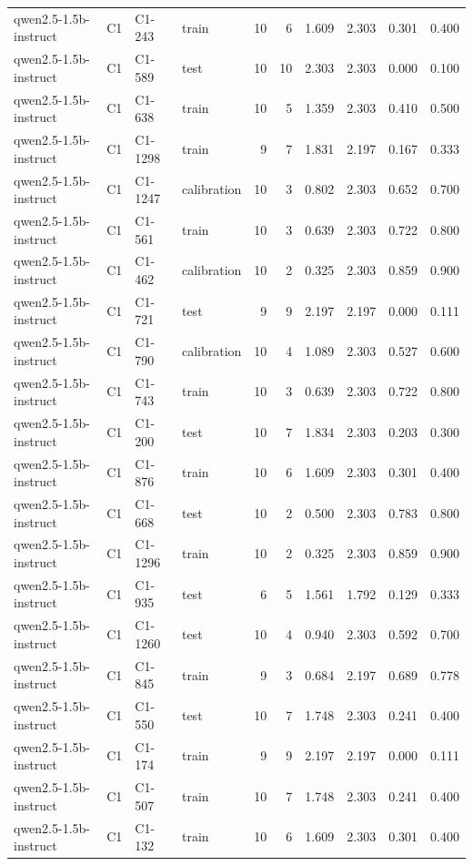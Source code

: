 \begin{table}
\begin{tabular}{llllrrrrrr}
qwen2.5-1.5b-instruct & C1 & C1-243 & train & 10 & 6 & 1.609 & 2.303 & 0.301 & 0.400 \\
qwen2.5-1.5b-instruct & C1 & C1-589 & test & 10 & 10 & 2.303 & 2.303 & 0.000 & 0.100 \\
qwen2.5-1.5b-instruct & C1 & C1-638 & train & 10 & 5 & 1.359 & 2.303 & 0.410 & 0.500 \\
qwen2.5-1.5b-instruct & C1 & C1-1298 & train & 9 & 7 & 1.831 & 2.197 & 0.167 & 0.333 \\
qwen2.5-1.5b-instruct & C1 & C1-1247 & calibration & 10 & 3 & 0.802 & 2.303 & 0.652 & 0.700 \\
qwen2.5-1.5b-instruct & C1 & C1-561 & train & 10 & 3 & 0.639 & 2.303 & 0.722 & 0.800 \\
qwen2.5-1.5b-instruct & C1 & C1-462 & calibration & 10 & 2 & 0.325 & 2.303 & 0.859 & 0.900 \\
qwen2.5-1.5b-instruct & C1 & C1-721 & test & 9 & 9 & 2.197 & 2.197 & 0.000 & 0.111 \\
qwen2.5-1.5b-instruct & C1 & C1-790 & calibration & 10 & 4 & 1.089 & 2.303 & 0.527 & 0.600 \\
qwen2.5-1.5b-instruct & C1 & C1-743 & train & 10 & 3 & 0.639 & 2.303 & 0.722 & 0.800 \\
qwen2.5-1.5b-instruct & C1 & C1-200 & test & 10 & 7 & 1.834 & 2.303 & 0.203 & 0.300 \\
qwen2.5-1.5b-instruct & C1 & C1-876 & train & 10 & 6 & 1.609 & 2.303 & 0.301 & 0.400 \\
qwen2.5-1.5b-instruct & C1 & C1-668 & test & 10 & 2 & 0.500 & 2.303 & 0.783 & 0.800 \\
qwen2.5-1.5b-instruct & C1 & C1-1296 & train & 10 & 2 & 0.325 & 2.303 & 0.859 & 0.900 \\
qwen2.5-1.5b-instruct & C1 & C1-935 & test & 6 & 5 & 1.561 & 1.792 & 0.129 & 0.333 \\
qwen2.5-1.5b-instruct & C1 & C1-1260 & test & 10 & 4 & 0.940 & 2.303 & 0.592 & 0.700 \\
qwen2.5-1.5b-instruct & C1 & C1-845 & train & 9 & 3 & 0.684 & 2.197 & 0.689 & 0.778 \\
qwen2.5-1.5b-instruct & C1 & C1-550 & test & 10 & 7 & 1.748 & 2.303 & 0.241 & 0.400 \\
qwen2.5-1.5b-instruct & C1 & C1-174 & train & 9 & 9 & 2.197 & 2.197 & 0.000 & 0.111 \\
qwen2.5-1.5b-instruct & C1 & C1-507 & train & 10 & 7 & 1.748 & 2.303 & 0.241 & 0.400 \\
qwen2.5-1.5b-instruct & C1 & C1-132 & train & 10 & 6 & 1.609 & 2.303 & 0.301 & 0.400 \\

\end{tabular}
\end{table}
